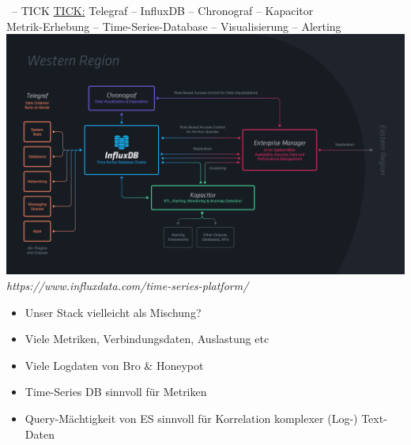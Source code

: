 \documentclass{beamer}
\begin{document}
\begin{frame}{\insertsection\ -- TICK}
	\underline{TICK:} Telegraf -- InfluxDB -- Chronograf -- Kapacitor\\
	Metrik-Erhebung -- Time-Series-Database -- Visualisierung -- Alerting
	\includegraphics[width=.9\linewidth,page=1]{img/TICK-Stack.png}\\
	\fontsize{4pt}{7.2}\selectfont
	\textit{https://www.influxdata.com/time-series-platform/}
\end{frame}

\begin{frame}{\insertsection}
	\begin{itemize}
		\setlength\itemsep{1em}
		\item Unser Stack vielleicht als Mischung?
		\item Viele Metriken, Verbindungsdaten, Auslastung etc
		\item Viele Logdaten von Bro \& Honeypot
		\item Time-Series DB sinnvoll für Metriken
		\item Query-Mächtigkeit von ES sinnvoll für Korrelation komplexer (Log-) Text-Daten
	\end{itemize}
\end{frame}





\section{\bibname}
\begin{frame}[allowframebreaks]{\bibname}
	\AtBeginSection{}
	\nocite{*}
	
	
\end{frame}
\end{document}
